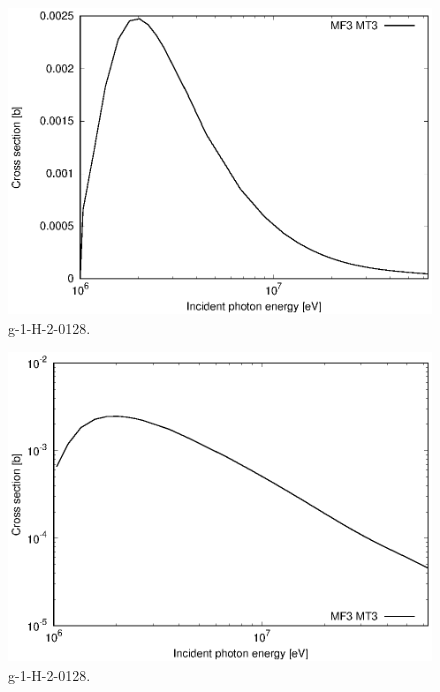 \begin{figure}
 \includegraphics[width=\linewidth]{eps/g_1-H-2_0128.eps}
  \caption{g-1-H-2-0128.}
\end{figure}
\begin{figure}
 \includegraphics[width=\linewidth]{eps-log/g_1-H-2_0128.eps}
 \caption{g-1-H-2-0128.}
\end{figure}
\newpage \clearpage

